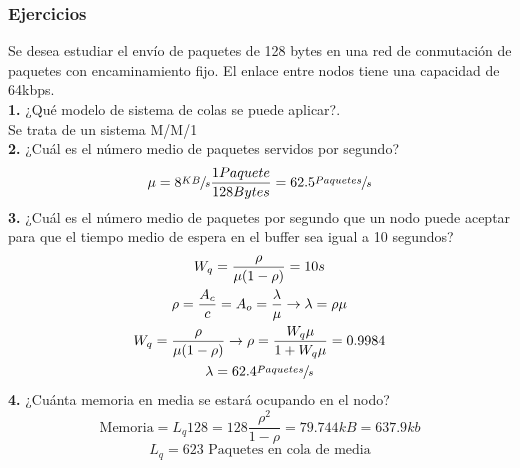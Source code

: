 \subsubsection{Ejercicios}
\begin{exercise}[1]
Se desea estudiar el envío de paquetes de 128 bytes en una red de conmutación de paquetes con encaminamiento fijo. El enlace entre nodos tiene una capacidad de 64kbps.\\
\textbf{1.} ¿Qué modelo de sistema de colas se puede aplicar?.\\
Se trata de un sistema M/M/1\\
\textbf{2.} ¿Cuál es el número medio de paquetes servidos por segundo?\\
\[\mu=8\sfrac{KB}{s}\frac{1Paquete}{128Bytes}=62.5\sfrac{Paquetes}{s}\]
\textbf{3.} ¿Cuál es el número medio de paquetes por segundo que un nodo puede aceptar para que el tiempo medio de espera en el buffer sea igual a 10 segundos?\\
\begin{gather*}
W_q=\frac{\rho}{\mu(1-\rho)}=10s\\
\rho=\frac{A_c}{c}=A_o=\frac{\lambda}{\mu}\to \lambda=\rho \mu\\
W_q=\frac{\rho}{\mu(1-\rho)}\to\rho=\frac{W_q \mu}{1+W_q\mu}=0.9984\\
\lambda=62.4\sfrac{Paquetes}{s}
\end{gather*}
\textbf{4.} ¿Cuánta memoria en media se estará ocupando en el nodo?\\
\[\text{Memoria}=L_q128=128\frac{\rho^2}{1-\rho}=79.744kB=637.9kb\]
\[L_q=623 \text{ Paquetes en cola de media}\]
\end{exercise}
